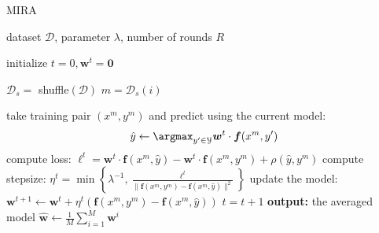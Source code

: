 \begin{algorithm}[t]

   \caption{MIRA \label{alg:mira}}

\begin{algorithmic}[1]
    dataset $\mathcal{D}$, parameter $\lambda$, number of rounds $R$

   \STATE initialize $t = 0, \boldsymbol{w}^t = \mathbf{0}$

         \STATE $\mathcal{D}_s =$ shuffle$(\mathcal{D})$
        \STATE $m = \mathcal{D}_s(i)$

	\STATE take training pair $(x^m, y^m)$ and predict using the current model: 
	$$\hat{y}  \leftarrow \argmax_{y'\in\mathcal{Y}} \boldsymbol{w}^t \cdot \boldsymbol{f}(x^m,y')$$
	\STATE compute loss: $\ell^t = \boldsymbol{w}^t \cdot \boldsymbol{f}(x^m,\hat{y}) - \boldsymbol{w}^t \cdot \boldsymbol{f}(x^m,y^m) + \rho(\hat{y},y^m)$
	\STATE compute stepsize: $\eta^t = \min\left\{\lambda^{-1}, \frac{\ell^t}{\|\boldsymbol{f}(x^m,y^m) - \boldsymbol{f}(x^m,\hat{y})\|^2}\right\}$
	\STATE update the model: 
	$\boldsymbol{w}^{t+1} \leftarrow  \boldsymbol{w}^{t} + \eta^t  (\boldsymbol{f}(x^m,y^m) - \boldsymbol{f}(x^m,\hat{y}))$
        \STATE $t = t+1$
	\ENDFOR
	\ENDFOR
   \STATE \textbf{output:} the averaged model $\hat{\boldsymbol{w}} \leftarrow \frac{1}{M}\sum_{i=1}^{M} \boldsymbol{w}^i$

\end{algorithmic}
%
%
%
%
%

\end{algorithm}



